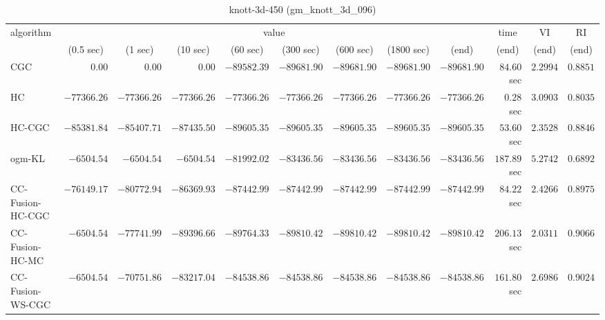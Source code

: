\begin{table}[H]
\scriptsize
\centering
\caption{knott-3d-450 (gm\_knott\_3d\_096)}
\label{tab:anytimetable-knott-3d-450-gm-knott-3d-096}
\begin{tabular}{lrrrrrrrrrrr}
\toprule
           algorithm &                                   \multicolumn{8}{c}{value} & \multicolumn{1}{c}{time}    & \multicolumn{1}{c}{VI}  & \multicolumn{1}{c}{RI} \\  
\cmidrule(lr){2-9}\cmidrule(lr){10-10} \cmidrule(lr){11-11} \cmidrule(lr){12-12}   
                     & \multicolumn{1}{c}{(0.5 sec)} & \multicolumn{1}{c}{(1 sec)} & \multicolumn{1}{c}{(10 sec)} & \multicolumn{1}{c}{(60 sec)} & \multicolumn{1}{c}{(300 sec)} & \multicolumn{1}{c}{(600 sec)} & \multicolumn{1}{c}{(1800 sec)} & \multicolumn{1}{c}{(end)} & \multicolumn{1}{c}{(end)}    & \multicolumn{1}{c}{(end)}   & \multicolumn{1}{c}{(end)}  \\ \midrule 
                 CGC & $         0.00$ & $         0.00$ & $         0.00$ & $    -89582.39$ & $    -89681.90$ & $    -89681.90$ & $    -89681.90$ & $    -89681.90$ & $        84.60$ sec    & $       2.2994$  & $       0.8851$ \\ 
                  HC & $    -77366.26$ & $    -77366.26$ & $    -77366.26$ & $    -77366.26$ & $    -77366.26$ & $    -77366.26$ & $    -77366.26$ & $    -77366.26$ & $         0.28$ sec    & $       3.0903$  & $       0.8035$ \\ 
              HC-CGC & $    -85381.84$ & $    -85407.71$ & $    -87435.50$ & $    -89605.35$ & $    -89605.35$ & $    -89605.35$ & $    -89605.35$ & $    -89605.35$ & $        53.60$ sec    & $       2.3528$  & $       0.8846$ \\ 
              ogm-KL & $     -6504.54$ & $     -6504.54$ & $     -6504.54$ & $    -81992.02$ & $    -83436.56$ & $    -83436.56$ & $    -83436.56$ & $    -83436.56$ & $       187.89$ sec    & $       5.2742$  & $       0.6892$ \\ 
    CC-Fusion-HC-CGC & $    -76149.17$ & $    -80772.94$ & $    -86369.93$ & $    -87442.99$ & $    -87442.99$ & $    -87442.99$ & $    -87442.99$ & $    -87442.99$ & $        84.22$ sec    & $       2.4266$  & $       0.8975$ \\ 
     CC-Fusion-HC-MC & $     -6504.54$ & $    -77741.99$ & $    -89396.66$ & $    -89764.33$ & $    -89810.42$ & $    -89810.42$ & $    -89810.42$ & $    -89810.42$ & $       206.13$ sec    & $       2.0311$  & $       0.9066$ \\ 
    CC-Fusion-WS-CGC & $     -6504.54$ & $    -70751.86$ & $    -83217.04$ & $    -84538.86$ & $    -84538.86$ & $    -84538.86$ & $    -84538.86$ & $    -84538.86$ & $       161.80$ sec    & $       2.6986$  & $       0.9024$ \\ 

\end{tabular}
\end{table}
